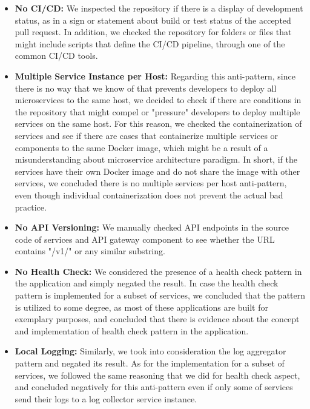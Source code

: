 \documentclass{Configuration_Files/PoliMi3i_thesis}
\begin{document}
\begin{itemize}
    \item \textbf{No CI/CD:} We inspected the repository if there is a display of development status, as in a sign or statement about build or test status of the accepted pull request.
    In addition, we checked the repository for folders or files that might include scripts that define the CI/CD pipeline, through one of the common CI/CD tools.
    
    \item \textbf{Multiple Service Instance per Host:} Regarding this anti-pattern, since there is no way that we know of that prevents developers to deploy all microservices to the same host, we decided to check if there are conditions in the repository that might compel or "pressure" developers to deploy multiple services on the same host.
    For this reason, we checked the containerization of services and see if there are cases that containerize multiple services or components to the same Docker image, which might be a result of a misunderstanding about microservice architecture paradigm.
    In short, if the services have their own Docker image and do not share the image with other services, we concluded there is no multiple services per host anti-pattern, even though individual containerization does not prevent the actual bad practice.
    
    \item \textbf{No API Versioning:} We manually checked API endpoints in the source code of services and API gateway component to see whether the URL contains "/v1/" or any similar substring.
    
    \item \textbf{No Health Check:} We considered the presence of a health check pattern in the application and simply negated the result.
    In case the health check pattern is implemented for a subset of services, we concluded that the pattern is utilized to some degree, as most of these applications are built for exemplary purposes, and concluded that there is evidence about the concept and implementation of health check pattern in the application.
    
    \item \textbf{Local Logging:} Similarly, we took into consideration the log aggregator pattern and negated its result.
    As for the implementation for a subset of services, we followed the same reasoning that we did for health check aspect,
    and concluded negatively for this anti-pattern even if only some of services send their logs to a log collector service instance.
\end{itemize}
\end{document}
